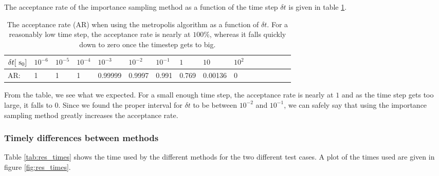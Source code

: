 The acceptance rate of the importance sampling method as a function of the time step $\delta t$ is given in table \ref{tab:IS_accept}.

\begin{table}[h!]
	\centering 
	\begin{tabular}{l l l l l l l l l l l l  l l l l }
	\toprule
	$\delta t [~\textrm{s}_0]$ & $10^{-6}$ & $10^{-5}$  & $10^{-4}$  & $10^{-3} $  & $ 10^{-2} $ & $ 10^{-1} $  & $ 1 $  & $ 10 $  & $ 10^{2}$\\
	\midrule
	AR: & 1 & 1 & 1 & 0.99999 & 0.9997 & 0.991 & 0.769 & 0.00136 & 0 \\
	\bottomrule
	\end{tabular}
	\caption{The acceptance rate (AR) when using the metropolis algorithm as a function of $\delta t$. 
			For a reasonably low time step, the acceptance rate is nearly at $100 \%$, whereas it falls quickly down to zero once the timestep gets to big.}
	\label{tab:IS_accept}
\end{table}

From the table, we see what we expected. 
For a small enough time step, the acceptance rate is nearly at $1$ and as the time step gets too large, it falls to $0$. 
Since we found the proper interval for $\delta t$ to be between $10^{-2}$ and $10^{-1}$, we can safely say that using the importance sampling method greatly increases the acceptance rate. 







\subsubsection{Timely differences between methods} \label{sec:res_timely_diff}

Table \ref{tab:res_times} shows the time used by the different methods for the two different test cases.
A plot of the times used are given in figure \ref{fig:res_times}. 

